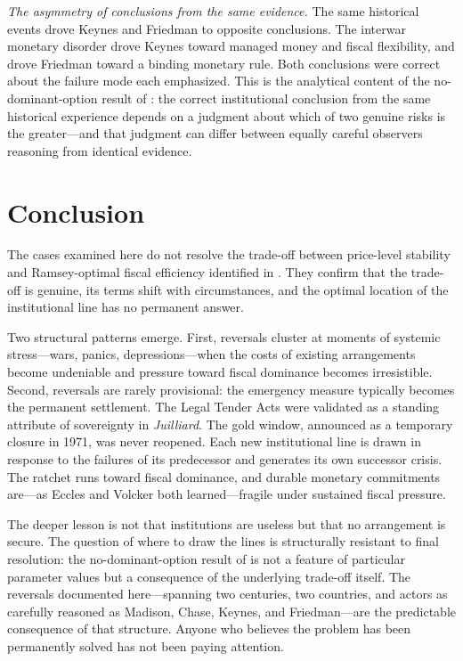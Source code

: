 \documentclass[12pt]{article}
\begin{document}
\textit{The asymmetry of conclusions from the same evidence.}  The same
historical events drove Keynes and Friedman to opposite conclusions.
The interwar monetary disorder drove Keynes toward managed money and
fiscal flexibility, and drove Friedman toward a binding monetary rule.
Both conclusions were correct about the failure mode each emphasized.
This is the analytical content of the no-dominant-option result of
\citet{Sargent2011}: the correct institutional conclusion from the same
historical experience depends on a judgment about which of two genuine
risks is the greater---and that judgment can differ between equally
careful observers reasoning from identical evidence.


\section{Conclusion}

The cases examined here do not resolve the trade-off between price-level
stability and Ramsey-optimal fiscal efficiency identified in
\citet{Sargent2011}.  They confirm that the trade-off is genuine, its
terms shift with circumstances, and the optimal location of the
institutional line has no permanent answer.

Two structural patterns emerge.  First, reversals cluster at moments of
systemic stress---wars, panics, depressions---when the costs of existing
arrangements become undeniable and pressure toward fiscal dominance
becomes irresistible.  Second, reversals are rarely provisional: the
emergency measure typically becomes the permanent settlement.  The Legal
Tender Acts were validated as a standing attribute of sovereignty in
\textit{Juilliard}.  The gold window, announced as a temporary closure
in 1971, was never reopened.  Each new institutional line is drawn in
response to the failures of its predecessor and generates its own
successor crisis.  The ratchet runs toward fiscal dominance, and durable
monetary commitments are---as Eccles and Volcker both learned---fragile
under sustained fiscal pressure.

The deeper lesson is not that institutions are useless but that no
arrangement is secure.  The question of where to draw the lines is
structurally resistant to final resolution: the no-dominant-option
result of \citet{Sargent2011} is not a feature of particular parameter
values but a consequence of the underlying trade-off itself.  The
reversals documented here---spanning two centuries, two countries, and
actors as carefully reasoned as Madison, Chase, Keynes, and
Friedman---are the predictable consequence of that structure.  Anyone
who believes the problem has been permanently solved has not been paying
attention.
\end{document}
